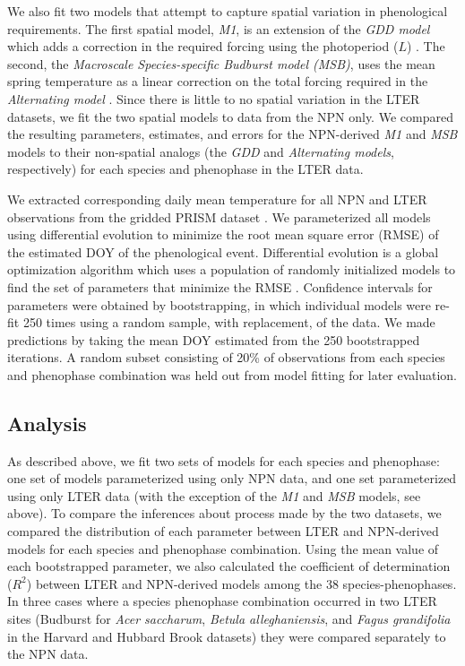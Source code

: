 \documentclass[fleqn,12pt,lineno]{article}
\begin{document}
We also fit two models that attempt to capture spatial variation in phenological requirements. The first spatial model, \textit{M1}, is an extension of the \textit{GDD model} which adds a correction in the required forcing using the photoperiod ($L$) \citep{blumel2012}. The second, the \textit{Macroscale Species-specific Budburst model (MSB)}, uses the mean spring temperature as a linear correction on the total forcing required in the \textit{Alternating model} \citep{jeong2013}. Since there is little to no spatial variation in the LTER datasets, we fit the two spatial models to data from the NPN only. We compared the resulting parameters, estimates, and errors for the NPN-derived \textit{M1} and \textit{MSB} models to their non-spatial analogs (the \textit{GDD} and \textit{Alternating models}, respectively) for each species and phenophase in the LTER data.  

We extracted corresponding daily mean temperature for all NPN and LTER observations from the gridded PRISM dataset \citep{prismdata}. We parameterized all models using differential evolution to minimize the root mean square error (RMSE) of the estimated DOY of the phenological event. Differential evolution is a global optimization algorithm which uses a population of randomly initialized models to find the set of parameters that minimize the RMSE \citep{storn1997}. Confidence intervals for parameters were obtained by bootstrapping, in which individual models were re-fit 250 times using a random sample, with replacement, of the data. We made predictions by taking the mean DOY estimated from the 250 bootstrapped iterations. A random subset consisting of 20\% of observations from each species and phenophase combination was held out from model fitting for later evaluation.

\subsection*{Analysis}

As described above, we fit two sets of models for each species and phenophase: one set of models parameterized using only NPN data, and one set parameterized using only LTER data (with the exception of the \textit{M1} and \textit{MSB} models, see above). To compare the inferences about process made by the two datasets, we compared the distribution of each parameter between LTER and NPN-derived models for each species and phenophase combination. Using the mean value of each bootstrapped parameter, we also calculated the coefficient of determination ($R^2$) between LTER and NPN-derived models among the 38 species-phenophases. In three cases where a species phenophase combination occurred in two LTER sites (Budburst for \textit{Acer saccharum}, \textit{Betula alleghaniensis}, and \textit{Fagus grandifolia} in the Harvard and Hubbard Brook datasets) they were compared separately to the NPN data.
\end{document}

